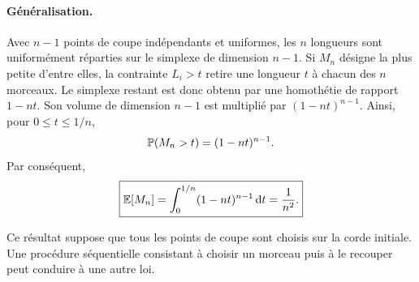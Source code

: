 \documentclass[11pt,a4paper]{article}
\begin{document}
\paragraph{Généralisation.}
Avec $n-1$ points de coupe indépendants et uniformes, les $n$ longueurs sont
uniformément réparties sur le simplexe de dimension $n-1$. Si $M_n$ désigne
la plus petite d'entre elles, la contrainte $L_i>t$ retire une longueur $t$ à
chacun des $n$ morceaux. Le simplexe restant est donc obtenu par une
homothétie de rapport $1-nt$. Son volume de dimension $n-1$ est multiplié par
$(1-nt)^{n-1}$. Ainsi, pour $0\leq t\leq1/n$,
\[
\mathbb P(M_n>t)=(1-nt)^{n-1}.
\]
Par conséquent,
\[
\boxed{
\mathbb E[M_n]
=\int_0^{1/n}(1-nt)^{n-1}\,\mathrm dt
=\frac1{n^2}.}
\]

\medskip
\noindent
Ce résultat suppose que tous les points de coupe sont choisis sur la corde
initiale. Une procédure séquentielle consistant à choisir un morceau puis à le
recouper peut conduire à une autre loi.
\end{document}
